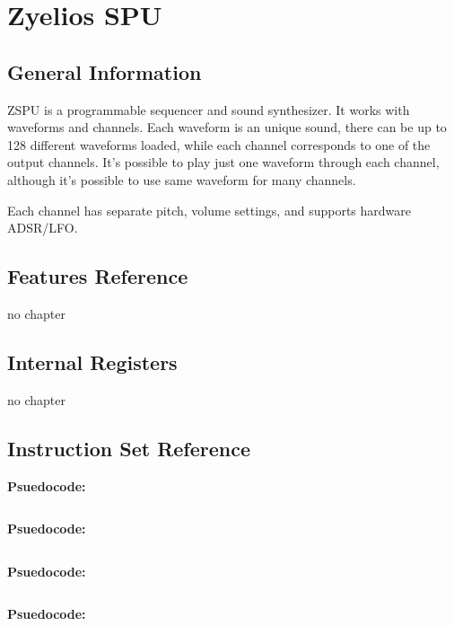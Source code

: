 \chapter{Zyelios SPU}
\section{General Information}
ZSPU is a programmable sequencer and sound synthesizer. It works with waveforms and channels. Each waveform is an unique sound, there can be up to 128 different waveforms loaded, while each channel corresponds to one of the output channels. It's possible to play just one waveform through each channel, although it's possible to use same waveform for many channels.

Each channel has separate pitch, volume settings, and supports hardware ADSR/LFO.

\section{Features Reference}
no chapter

\section{Internal Registers}
no chapter

\section{Instruction Set Reference}


\textbf{Psuedocode:}
\begin{verbatim}
\end{verbatim}



\textbf{Psuedocode:}
\begin{verbatim}
\end{verbatim}



\textbf{Psuedocode:}
\begin{verbatim}
\end{verbatim}



\textbf{Psuedocode:}
\begin{verbatim}
\end{verbatim}



